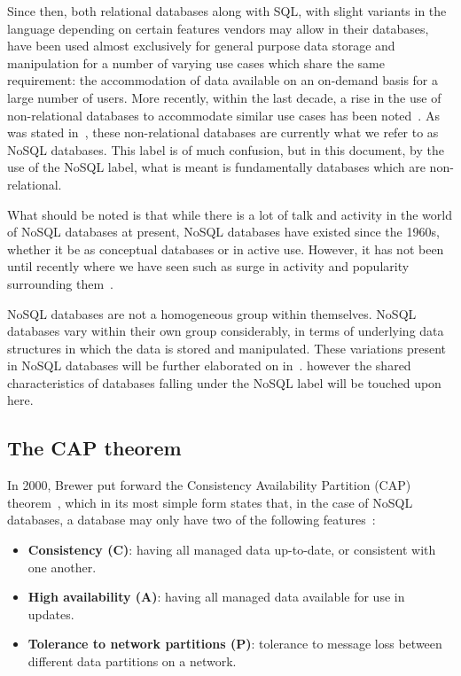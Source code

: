 \documentclass{article}
\begin{document}
Since then, both relational databases along with SQL, with slight variants in the language depending on certain features
vendors may allow in their databases, have been used almost exclusively for general purpose data storage
and manipulation for a number of varying use cases which share the same requirement: the accommodation of data
available on an on-demand basis for a large number of users. More recently, within the last decade, a rise
in the use of non-relational databases to accommodate similar use cases has been noted~\cite{padhy2011rdbms}.
As was stated in~, these non-relational databases are currently what we refer to
as NoSQL databases. This label is of much confusion, but in this document, by the use of the NoSQL label, what
is meant is fundamentally databases which are non-relational.

What should be noted is that while there is a lot of talk and activity in the world of NoSQL databases at
present, NoSQL databases have existed since the 1960s, whether it be as conceptual databases or in active use.
However, it has not been until recently where we have seen such as surge in activity and popularity
surrounding them~\cite{leavitt2010will}.

NoSQL databases are not a homogeneous group within themselves. NoSQL databases vary within their own group
considerably, in terms of underlying data structures in which the data is stored and manipulated. These
variations present in NoSQL databases will be further elaborated on in~.
however the shared characteristics of databases falling under the NoSQL label will be touched upon here.

\subsection{The CAP theorem} %
\label{ssub:cap_theorem}

In 2000, Brewer put forward the Consistency Availability Partition (CAP) theorem~\cite{brewer2000towards}, which in its most simple form
states that, in the case of NoSQL databases, a database may only have two of the following features~\cite{brewer2012pushing}:

\begin{itemize}
    \item \textbf{Consistency (C)}: having all managed data up-to-date, or consistent with one another.
    \item \textbf{High availability (A)}: having all managed data available for use in updates.
    \item \textbf{Tolerance to network partitions (P)}: tolerance to message loss between different data partitions on a network.
\end{itemize}
\end{document}
